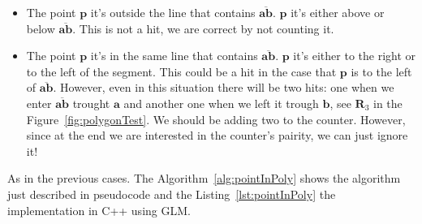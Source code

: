 \begin{itemize}
  \item The point $\mathbf{p}$ it's outside the line that contains $\overline{\mathbf{a}\mathbf{b}}$.
  $\mathbf{p}$ it's either above or below $\overline{\mathbf{a}\mathbf{b}}$.
  This is not a hit, we are correct by not counting it.
  \item The point $\mathbf{p}$ it's in the same line that contains $\overline{\mathbf{a}\mathbf{b}}$.
  $\mathbf{p}$ it's either to the right or to the left of the segment.
  This could be a hit in the case that $\mathbf{p}$ is to the left of $\overline{\mathbf{a}\mathbf{b}}$.
  However, even in this situation there will be two hits: one when we enter $\overline{\mathbf{a}\mathbf{b}}$ trought $\mathbf{a}$ and another one when we left it trough $\mathbf{b}$, see $\mathbf{R}_3$ in the Figure~\ref{fig:polygonTest}.
  We should be adding two to the counter.
  However, since at the end we are interested in the counter's pairity, we can just ignore it!
\end{itemize}

As in the previous cases. The Algorithm~\ref{alg:pointInPoly} shows the algorithm just described in pseudocode and the Listing~\ref{lst:pointInPoly} the implementation in C++ using GLM.

